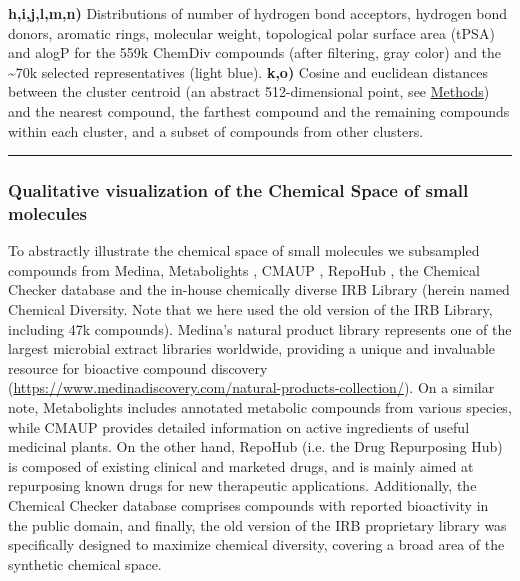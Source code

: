 \begin{Figure_modified}
{    \textbf{h,i,j,l,m,n)} Distributions of number of hydrogen bond acceptors, hydrogen bond donors, aromatic rings, molecular weight, topological polar surface area (tPSA) and alogP for the 559k ChemDiv compounds (after filtering, gray color) and the \textasciitilde70k selected representatives (light blue).
    \textbf{k,o)} Cosine and euclidean distances between the cluster centroid (an abstract 512-dimensional point, see \hyperref[Navigation_Methods]{Methods}) and the nearest compound, the farthest compound and the remaining compounds within each cluster, and a subset of compounds from other clusters.
}
  \vspace{-5mm}
  \rule[0ex]{\textwidth}{0.5pt}
  \vspace{-9mm}
  \label{Navigation_Fig1}
\end{Figure_modified}

\subsubsection{Qualitative visualization of the Chemical Space of small molecules}

To abstractly illustrate the chemical space of small molecules we subsampled compounds from Medina, Metabolights \cite{yurekten_metabolights_2024, haug_metabolights_2019}, CMAUP \cite{zeng_cmaup_2019, hou_cmaup_2024}, RepoHub \cite{corsello_drug_2017}, the Chemical Checker database \cite{duran-frigola_extending_2020} and the in-house chemically diverse IRB Library (herein named Chemical Diversity. Note that we here used the old version of the IRB Library, including 47k compounds). Medina’s natural product library represents one of the largest microbial extract libraries worldwide, providing a unique and invaluable resource for bioactive compound discovery (\href{https://www.medinadiscovery.com/natural-products-collection/}{https://www.medinadiscovery.com/natural-products-collection/}). On a similar note, Metabolights includes annotated metabolic compounds from various species, while CMAUP provides detailed information on active ingredients of useful medicinal plants. On the other hand, RepoHub (i.e. the Drug Repurposing Hub) is composed of existing clinical and marketed drugs, and is mainly aimed at repurposing known drugs for new therapeutic applications. Additionally, the Chemical Checker database comprises compounds with reported bioactivity in the public domain, and finally, the old version of the IRB proprietary library was specifically designed to maximize chemical diversity, covering a broad area of the synthetic chemical space.

